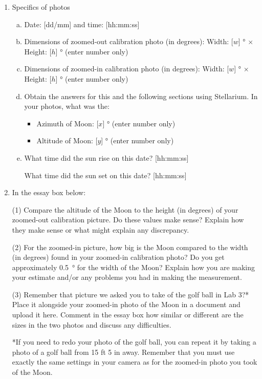 \documentclass[12pt]{article}
\begin{document}
\begin{enumerate}
\item
Specifics of photos
\begin{enumerate}[a.]
    \item
    Date: [dd/mm] and time: [hh:mm:ss]
    \item
    Dimensions of zoomed-out calibration photo (in degrees): Width: [$w$] \si{\degree} $\times$ Height: [$h$] \si{\degree} (enter number only)
    \item
    Dimensions of zoomed-in calibration photo (in degrees): Width: [$w$] \si{\degree} $\times$ Height: [$h$] \si{\degree} (enter number only)
    \item
    Obtain the answers for this and the following sections using Stellarium.
    In your photos, what was the:
    \begin{itemize}
        \item Azimuth of Moon: [$x$] \si{\degree} (enter number only)
        \item Altitude of Moon: [$y$] \si{\degree} (enter number only)
    \end{itemize}
    \item
    What time did the sun rise on this date?  [hh:mm:ss]
    
    What time did the sun set on this date?  [hh:mm:ss]
\end{enumerate}
 
\item
In the essay box below:

(1) Compare the altitude of the Moon to the height (in degrees) of your zoomed-out calibration picture. Do these values make sense? Explain how they make sense or what might explain any discrepancy.

(2) For the zoomed-in picture, how big is the Moon compared to the width (in degrees) found in your zoomed-in calibration photo? Do you get approximately \SI{0.5}{\degree} for the width of the Moon? Explain how you are making your estimate and/or any problems you had in making the measurement.

(3) Remember that picture we asked you to take of the golf ball in Lab 3?* Place it alongside your zoomed-in photo of the Moon in a document and upload it here. Comment in the essay box how similar or different are the sizes in the two photos and discuss any difficulties.

*If you need to redo your photo of the golf ball, you can repeat it by taking a photo of a golf ball from 15 ft 5 in away. Remember that you must use exactly the same settings in your camera as for the zoomed-in photo you took of the Moon.
\end{enumerate}
\end{document}

